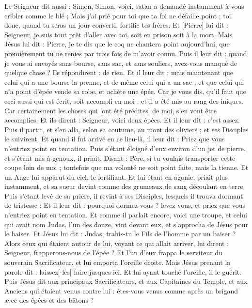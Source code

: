 \begin{multicols}{2}
Le Seigneur dit aussi : Simon, Simon, voici, satan a demandé instamment à vous cribler comme le blé ;
Mais j'ai prié pour toi que ta foi ne défaille point ; toi donc, quand tu seras un jour converti, fortifie tes frères.
Et [Pierre] lui dit : Seigneur, je suis tout prêt d'aller avec toi, soit en prison soit à la mort.
Mais Jésus lui dit : Pierre, je te dis que le coq ne chantera point aujourd'hui, que premièrement tu ne renies par trois fois de m'avoir connu.
Puis il leur dit : quand je vous ai envoyés sans bourse, sans sac, et sans souliers, avez-vous manqué de quelque chose ? Ils répondirent : de rien.
Et il leur dit : mais maintenant que celui qui a une bourse la prenne, et de même celui qui a un sac ; et que celui qui n'a point d'épée vende sa robe, et achète une épée.
Car je vous dis, qu'il faut que ceci aussi qui est écrit, soit accompli en moi : et il a été mis au rang des iniques. Car certainement les choses qui [ont été prédites] de moi, s'en vont être accomplies.
Et ils dirent : Seigneur, voici deux épées. Et il leur dit : c'est assez.
Puis il partit, et s'en alla, selon sa coutume, au mont des oliviers ; et ses Disciples le suivirent.
Et quand il fut arrivé en ce lieu-là, il leur dit : Priez que vous n'entriez point en tentation.
Puis s'étant éloigné d'eux environ d'un jet de pierre, et s'étant mis à genoux, il priait,
Disant : Père, si tu voulais transporter cette coupe loin de moi ; toutefois que ma volonté ne soit point faite, mais la tienne.
Et un Ange lui apparut du ciel, le fortifiant.
Et lui étant en agonie, priait plus instamment, et sa sueur devint comme des grumeaux de sang découlant en terre.
Puis s'étant levé de sa prière, il revint à ses Disciples, lesquels il trouva dormant de tristesse ;
Et il leur dit : pourquoi dormez-vous ? levez-vous, et priez que vous n'entriez point en tentation.
Et comme il parlait encore, voici une troupe, et celui qui avait nom Judas, l'un des douze, vint devant eux, et s'approcha de Jésus pour le baiser.
Et Jésus lui dit : Judas, trahis-tu le Fils de l'homme par un baiser ?
Alors ceux qui étaient autour de lui, voyant ce qui allait arriver, lui dirent : Seigneur, frapperons-nous de l'épée ?
Et l'un d'eux frappa le serviteur du souverain Sacrificateur, et lui emporta l'oreille droite.
Mais Jésus prenant la parole dit : laissez[-les] faire jusques ici. Et lui ayant touché l'oreille, il le guérit.
Puis Jésus dit aux principaux Sacrificateurs, et aux Capitaines du Temple, et aux Anciens qui étaient venus contre lui : êtes-vous venus comme après un brigand avec des épées et des bâtons ?

\end{multicols}
